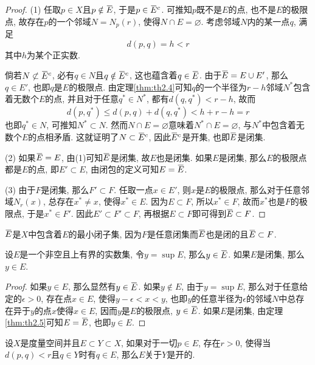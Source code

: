 \documentclass[cn,12pt,math=mtpro2,citestyle=gb7714-2015,bibstyle=gb7714-2015,twocol]{elegantbook}
\newcommand{\overbar}[1]{\mkern 1.5mu\overline{\mkern-1.5mu#1\mkern-1.5mu}\mkern 1.5mu}
\let\emptyset\varnothing
\begin{document}
\begin{proof}
  (1) 任取$p\in X$且$p\notin \overbar{E}$,  于是$p\in\overbar{E}^c$. 可推知$p$既不是$E$的点, 也不是$E$的极限点, 故存在$p$的一个邻域$N=N_p(r)$, 使得$N\cap E=\emptyset$. 考虑邻域$N$内的某一点$q$, 满足
    $$d(p,q)=h<r$$
    其中$h$为某个正实数.

  倘若$N\not\subset\overbar{E}^c$, 必有$q\in N$且$q \notin \overbar{E}^c$,
  这也蕴含着$q \in \overbar{E}$. 由于$\overbar{E}=E\cup E'$, 那么$q \in E'$, 也即$q$是$E$的极限点. 由定理\ref{thm:th2.4}可知$q$的一个半径为$r-h$邻域$N^\ast$包含着无数个$E$的点, 并且对于任意$q^\ast\in N^\ast$, 都有$d(q,q^\ast)<r-h$, 故而
  $$d(p,q^\ast)\leq d(p,q)+d(q,q^\ast)<h+r-h=r$$
 也即$q^\ast \in N$, 可推知$N^\ast\subset N$. 然而$N\cap E=\emptyset$意味着$N^\ast\cap E=\emptyset$, 与$N^\ast$中包含着无数个$E$的点相矛盾. 这就证明了$N \subset \overbar{E}^c$, 因此$\overbar{E}^c$是开集, 也即$\overbar{E}$是闭集.

  (2) 如果$\overbar{E}=E$, 由(1)可知$\overbar{E}$是闭集, 故$E$也是闭集. 如果$E$是闭集, 那么$E$的极限点都是$E$的点, 即$E'\subset E$, 由闭包的定义可知$E=\overbar{E}$.

  (3) 由于$F$是闭集, 那么$F' \subset F$. 任取一点$x\in E'$, 则$x$是$E$的极限点, 那么对于任意邻域$N_r(x)$, 总存在$ x^\ast\neq x$, 使得$x^\ast\in E$. 因为$E\subset F$, 所以$x^\ast \in F$, 故而$x^\ast$也是$F$的极限点, 于是$x^\ast \in F'$. 因此$E' \subset F'\subset F$, 再根据$E\subset F$即可得到$\overbar{E}\subset F$.
\end{proof}
$\overbar{E}$是$X$中包含着$E$的最小闭子集, 因为$F$是任意闭集而$\overbar{E}$也是闭的且$\overbar{E}\subset F$.
\begin{theorem}\label{thm:th2.15}
  设$E$是一个非空且上有界的实数集, 令$y=\sup E$, 那么$y\in \overbar{E}$. 如果$E$是闭集, 那么$y \in E$.
\end{theorem}
\begin{proof}
  如果$y\in E$, 那么显然有$y\in\overbar{E}$. 如果$y \notin E$, 由于$y=\sup E$, 那么对于任意给定的$ \epsilon>0$, 存在点$ x\in E$, 使得$y-\epsilon<x<y$, 也即$y$的任意半径为$\epsilon$的邻域$N$中总存在异于$y$的点$x$使得$x\in E$, 因而$y$是$E$的极限点, $y\in \overbar{E}$. 如果$E$是闭集, 由定理\ref{thm:th2.5}可知$E=\overbar{E}$, 也即$y \in E$.


\end{proof}
\begin{definition}
设$X$是度量空间并且$E\subset Y\subset X$, 如果对于一切$ p\in E$, 存在$ r>0$, 使得当$d(p,q)<r$且$q\in Y$时有$q\in E$, 那么$E$关于$Y$是开的.
\end{definition}
\end{document}
